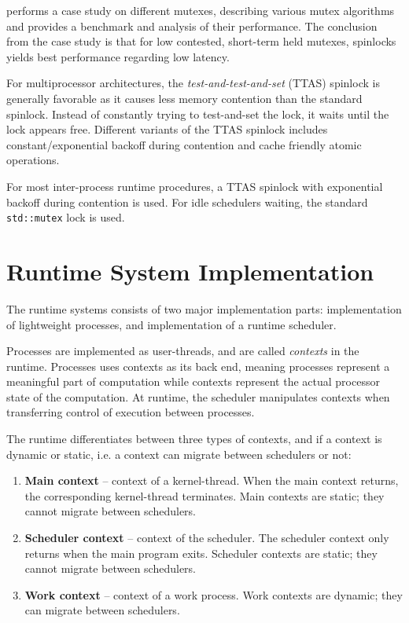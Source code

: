  performs a case study on different mutexes, describing various mutex algorithms and provides a benchmark and analysis of their performance. The conclusion from the case study is that for low contested, short\hyp{}term held mutexes, spinlocks yields best performance regarding low latency. 

For multiprocessor architectures, the \textit{test\hyp{}and\hyp{}test\hyp{}and\hyp{}set} (TTAS) spinlock is generally favorable as it causes less memory contention than the standard spinlock. Instead of constantly trying to test\hyp{}and\hyp{}set the lock, it waits until the lock appears free. Different variants of the TTAS spinlock includes constant/exponential backoff during contention and cache friendly atomic operations.

For most inter\hyp{}process runtime procedures, a TTAS spinlock with exponential backoff during contention is used. For idle schedulers waiting, the standard \lstinline[style={CustomC++}]|std::mutex| lock is used.


\section{Runtime System Implementation}
\label{sec:runtime_system_implementation}


The runtime systems consists of two major implementation parts: implementation of lightweight processes, and implementation of a runtime scheduler.

Processes are implemented as user\hyp{}threads, and are called \textit{contexts} in the runtime. Processes uses contexts as its back end, meaning processes represent a meaningful part of computation while contexts represent the actual processor state of the computation. At runtime, the scheduler manipulates contexts when transferring control of execution between processes. 

The runtime differentiates between three types of contexts, and if a context is dynamic or static, i.e. a context can migrate between schedulers or not:

\begin{enumerate}[topsep=0em,itemsep=-1em,partopsep=0.5em,parsep=1em]
    \item \textbf{Main context} -- context of a kernel\hyp{}thread. When the main context returns, the corresponding kernel\hyp{}thread terminates. Main contexts are static; they cannot migrate between schedulers.
    \item \textbf{Scheduler context} -- context of the scheduler. The scheduler context only returns when the main program exits. Scheduler contexts are static; they cannot migrate between schedulers.
    \item \textbf{Work context} -- context of a work process. Work contexts are dynamic; they can migrate between schedulers.
\end{enumerate}

